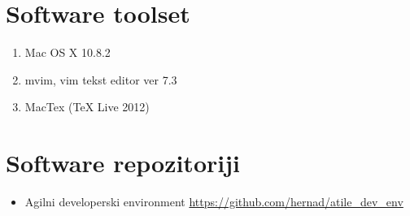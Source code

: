 \documentclass[times, utf8, seminar]{fit}
\begin{document}
\chapter{Software toolset}
\begin{enumerate}
  \item Mac OS X 10.8.2
  \item mvim, vim tekst editor ver 7.3
  \item MacTex (TeX Live 2012)
\end{enumerate}

\chapter{Software repozitoriji}

\begin{itemize}
  \item Agilni developerski environment  \url{https://github.com/hernad/atile\_dev\_env}

\end{itemize}
\end{document}
